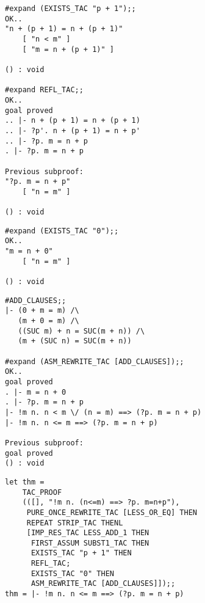 
\vskip4mm
\begin{session}\begin{verbatim}
#expand (EXISTS_TAC "p + 1");;
OK..
"n + (p + 1) = n + (p + 1)"
    [ "n < m" ]
    [ "m = n + (p + 1)" ]

() : void

#expand REFL_TAC;;
OK..
goal proved
.. |- n + (p + 1) = n + (p + 1)
.. |- ?p'. n + (p + 1) = n + p'
.. |- ?p. m = n + p
. |- ?p. m = n + p

Previous subproof:
"?p. m = n + p"
    [ "n = m" ]

() : void
\end{verbatim}\end{session}





\vskip4mm
\begin{session}\begin{verbatim}
#expand (EXISTS_TAC "0");;
OK..
"m = n + 0"
    [ "n = m" ]

() : void
\end{verbatim}\end{session}



\vskip4mm
\begin{session}\begin{verbatim}
#ADD_CLAUSES;;
|- (0 + m = m) /\
   (m + 0 = m) /\
   ((SUC m) + n = SUC(m + n)) /\
   (m + (SUC n) = SUC(m + n))

#expand (ASM_REWRITE_TAC [ADD_CLAUSES]);;
OK..
goal proved
. |- m = n + 0
. |- ?p. m = n + p
|- !m n. n < m \/ (n = m) ==> (?p. m = n + p)
|- !m n. n <= m ==> (?p. m = n + p)

Previous subproof:
goal proved
() : void
\end{verbatim}\end{session}



\point{The entire proof is:}
\vskip4mm
\begin{session}\begin{verbatim}
let thm =
    TAC_PROOF
    (([], "!m n. (n<=m) ==> ?p. m=n+p"),
     PURE_ONCE_REWRITE_TAC [LESS_OR_EQ] THEN
     REPEAT STRIP_TAC THENL
     [IMP_RES_TAC LESS_ADD_1 THEN
      FIRST_ASSUM SUBST1_TAC THEN
      EXISTS_TAC "p + 1" THEN
      REFL_TAC;
      EXISTS_TAC "0" THEN
      ASM_REWRITE_TAC [ADD_CLAUSES]]);;
thm = |- !m n. n <= m ==> (?p. m = n + p)
\end{verbatim}\end{session}



